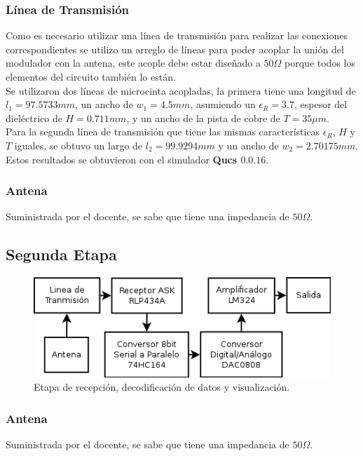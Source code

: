 \documentclass[twocolumn]{IEEEtran}
\begin{document}
\subsubsection{Línea de Transmisión} \label{LTx}
\noindent
Como es necesario utilizar una línea de transmisión para realizar las conexiones correspondientes se utilizo un arreglo de líneas para poder acoplar la unión del modulador con la antena, este acople debe estar diseñado a $50\Omega$ porque todos los elementos del circuito también lo están.\\
Se utilizaron dos líneas de microcinta acopladas, la primera tiene una longitud de $l_1=97.5733mm$, un ancho de $w_1=4.5mm$, asumiendo un $\epsilon _R = 3.7$, espesor del dieléctrico de $H=0.711mm$, y un ancho de la pista de cobre de $T=35 \mu m$.\\
Para la segunda línea de transmisión que tiene las mismas características $\epsilon _R$, $H$ y $T$ iguales, se obtuvo un largo de $l_2=99.9294mm$ y un ancho de $w_2=2.70175mm$.\\
Estos resultados se obtuvieron con el simulador \textbf{Qucs $0.0.16$}.

\subsubsection{Antena}
\noindent
Suministrada por el docente, se sabe que tiene una impedancia de $50 \Omega$.

\subsection{Segunda Etapa}
\begin{figure}[H]
	\centering
		\includegraphics[scale=0.55]{Diagrama2.png}
	\caption{Etapa de recepción, decodificación de datos y visualización.}
	\label{fig4}
\end{figure}

\subsubsection{Antena}
\noindent
Suministrada por el docente, se sabe que tiene una impedancia de $50 \Omega$.
\end{document}
